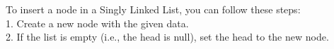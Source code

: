 \documentclass[preview]{standalone}
\begin{document}
To insert a node in a Singly Linked List, you can follow these steps:\\1. Create a new node with the given data.\\2. If the list is empty (i.e., the head is null), set the head to the new node.\\
\end{document}
